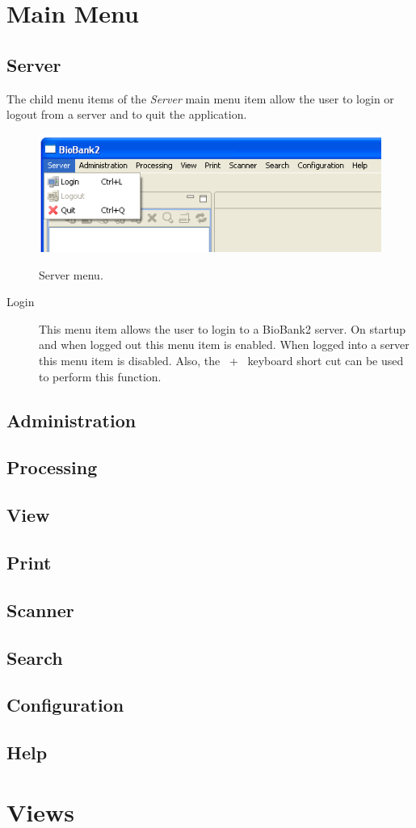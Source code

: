 \section{Main Menu}
\label{sec:main_menu}

\subsection{Server}
The child menu items of the \emph{Server} main menu item allow the user to
login or logout from a server and to quit the application.
    \begin{figure}[H]
      \centering
      \scalebox{0.5}
      { \includegraphics*{screenshots/overview/main_menu_server} }
      \caption{Server menu.}
      \label{fig:main_menu_server}
    \end{figure}
\begin{description}
  \item[Login] This menu item allows the user to login to a BioBank2 server. On
    startup and when logged out this menu item is enabled. When logged into a
    server this menu item is disabled. Also, the \mbox{ + }
    keyboard short cut can be used to perform this function.
\end{description}

\subsection{Administration}
\subsection{Processing}
\subsection{View}
\subsection{Print}
\subsection{Scanner}
\subsection{Search}
\subsection{Configuration}
\subsection{Help}

\section{Views}
\label{sec:application_views}
